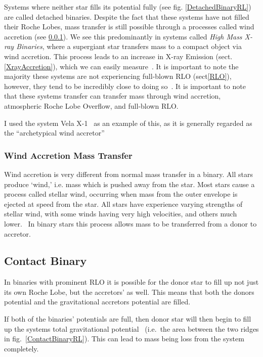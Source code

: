 \documentclass[12pt, a4paper]{article}
\begin{document}
        Systems where neither star fills its potential fully (see fig. \ref{DetachedBinaryRL}) are called detached binaries. Despite the fact that these systems have not filled their Roche Lobes, mass transfer is still possible through a processes called wind accretion (see \ref{WindAccretion}). We see this predominantly in systems called \textit{High Mass X-ray Binaries}, where a supergiant star transfers mass to a compact object via wind accretion. This process leads to an increase in X-ray Emission (sect. \ref{XrayAccretion}), which we can easily measure~\cite{TaurisvandenHeuvel+2023}. It is important to note the majority these systems are not experiencing full-blown RLO (sect\ref{RLO}), however, they tend to be incredibly close to doing so~\cite{TaurisvandenHeuvel+2023}. It is important to note that these systems transfer can transfer mass through wind accretion, atmospheric Roche Lobe Overflow, and full-blown RLO. 

        I used the system Vela X-1~\cite{Kretschmar_2021} as an example of this, as it is generally regarded as the ``archetypical wind accretor''~\cite{Kretschmar_2021} 

        \subsubsection{Wind Accretion Mass Transfer} \label{WindAccretion}
        Wind accretion is very different from normal mass transfer in a binary. All stars produce `wind,' i.e. mass which is pushed away from the star. Most stars cause a process called stellar wind, occurring when mass from the outer envelope is ejected at speed from the star. All stars have experience varying strengths of stellar wind, with some winds having very high velocities, and others much lower.~\cite{Lamers_1999} In binary stars this process allows mass to be transferred from a donor to accretor.
        
        

        \subsection{\centering Contact Binary}
        In binaries with prominent RLO it is possible for the donor star to fill up not just its own Roche Lobe, but the accretors' as well. This means that both the donors  potential and the gravitational accretors potential are filled.
        
        If both of the binaries' potentials are full, then donor star will then begin to fill up the systems total gravitational potential \ (i.e.\ the area between the two ridges in fig.~\ref{ContactBinaryRL}). This can lead to mass being loss from the system completely. 
        
\end{document}
